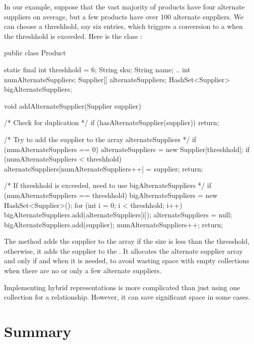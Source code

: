 In our example, suppose that the vast majority of products have four alternate
suppliers on average, but a few products have over 100 alternate suppliers. We
can choose a threshhold, say six entries, which triggers a conversion to a
 when the threshhold is exceeded. Here is the class
:

\begin{shortlisting} 
public class Product {

	    static final int threshhold = 6;
		String sku;
		String name;
		..
		int numAlternateSuppliers;
		Supplier[] alternateSuppliers;
		HashSet<Supplier> bigAlternateSuppliers;
		
		void addAlternateSupplier(Supplier supplier) {
		
		    /* Check for duplication */
		    if (hasAlternateSupplier(supplier)) {
		         return;
		    }
		
		    /* Try to add the supplier to the array alternateSuppliers */
		    if (numAlternateSuppliers == 0) {
		        alternateSuppliers = new Supplier[threshhold];
		    }
			if (numAlternateSuppliers < threshhold) {
			    alternateSuppliers[numAlternateSuppliers++] = supplier;
			    return;
			}
			
			/* If threshhold is exceeded, need to use bigAlternateSuppliers */
			if (numAlternateSuppliers == threshhold) {
			    bigAlternateSuppliers = new HashSet<Supplier>();
			    for (int i = 0; i < threshhold; i++) {
			    	bigAlternateSuppliers.add(alternateSuppliers[i]);
			    }
			    alternateSuppliers = null;
			}
			bigAlternateSuppliers.add(supplier);
			numAlternateSuppliers++;
			return;
		}
}
\end{shortlisting}
The method  adds the supplier to the array if the
size is less than the thresshold, otherwise, it adds the supplier to the .
It allocates the alternate supplier array and  
only if and when it is needed, to avoid wasting space with empty collections
when there are no or only a few alternate suppliers.

Implementing hybrid representations is more complicated than just using one
collection for a relationship. However, it can save significant space in some
cases.

\section{Summary}

